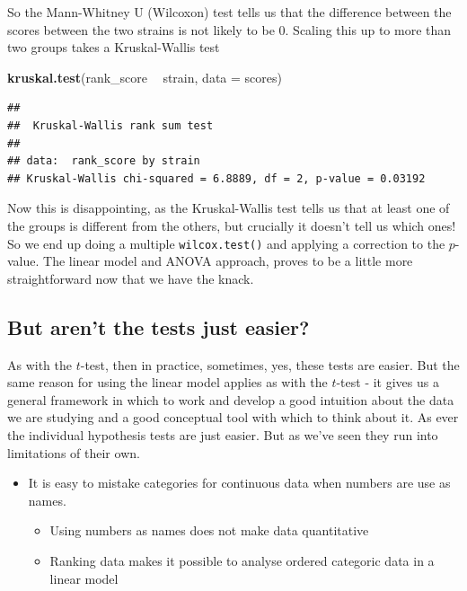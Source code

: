 \documentclass[
]{book}
\newenvironment{Shaded}{\begin{snugshade}}{\end{snugshade}}
\newcommand{\DataTypeTok}[1]{\textcolor[rgb]{0.13,0.29,0.53}{#1}}
\newcommand{\KeywordTok}[1]{\textcolor[rgb]{0.13,0.29,0.53}{\textbf{#1}}}
\newcommand{\NormalTok}[1]{#1}
\newcommand{\OperatorTok}[1]{\textcolor[rgb]{0.81,0.36,0.00}{\textbf{#1}}}
\newcommand{\StringTok}[1]{\textcolor[rgb]{0.31,0.60,0.02}{#1}}
\providecommand{\tightlist}{%
  \setlength{\itemsep}{0pt}\setlength{\parskip}{0pt}}
\newenvironment{roundup}
{ \begin{tcolorbox}[colbacktitle=yellow!50!white,
title=Round Up,coltitle=black,
fonttitle=\bfseries] }
{  \end{tcolorbox} }
\begin{document}
So the Mann-Whitney U (Wilcoxon) test tells us that the difference between the scores between the two strains is not likely to be 0. Scaling this up to more than two groups takes a Kruskal-Wallis test

\begin{Shaded}
\begin{Highlighting}[]
\KeywordTok{kruskal.test}\NormalTok{(rank_score }\OperatorTok{~}\StringTok{ }\NormalTok{strain, }\DataTypeTok{data =}\NormalTok{ scores)}
\end{Highlighting}
\end{Shaded}

\begin{verbatim}
## 
## 	Kruskal-Wallis rank sum test
## 
## data:  rank_score by strain
## Kruskal-Wallis chi-squared = 6.8889, df = 2, p-value = 0.03192
\end{verbatim}

Now this is disappointing, as the Kruskal-Wallis test tells us that at least one of the groups is different from the others, but crucially it doesn't tell us which ones! So we end up doing a multiple \texttt{wilcox.test()} and applying a correction to the \(p\)-value. The linear model and ANOVA approach, proves to be a little more straightforward now that we have the knack.

\hypertarget{but-arent-the-tests-just-easier}{%
\subsection{But aren't the tests just easier?}\label{but-arent-the-tests-just-easier}}

As with the \(t\)-test, then in practice, sometimes, yes, these tests are easier. But the same reason for using the linear model applies as with the \(t\)-test - it gives us a general framework in which to work and develop a good intuition about the data we are studying and a good conceptual tool with which to think about it. As ever the individual hypothesis tests are just easier. But as we've seen they run into limitations of their own.

\begin{roundup}
\begin{itemize}
\tightlist
\item
  It is easy to mistake categories for continuous data when numbers are use as names.

  \begin{itemize}
  \tightlist
  \item
    Using numbers as names does not make data quantitative
  \item
    Ranking data makes it possible to analyse ordered categoric data in a linear model
  \end{itemize}
\end{itemize}
\end{roundup}
\end{document}
